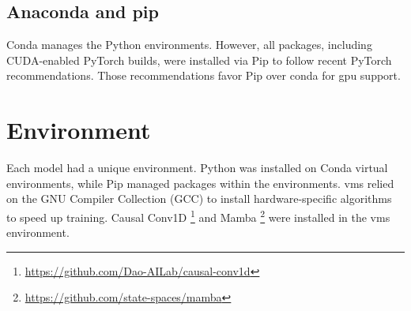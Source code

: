 \subsection{Anaconda and pip}
\label{ssec:conda_pip}
Conda manages the Python environments. However, all packages, including CUDA-enabled PyTorch builds, were installed via Pip to follow recent PyTorch recommendations. Those recommendations favor Pip over conda for \acrshort{gpu} support.

\section{Environment} 

Each model had a unique environment. Python was installed on Conda virtual environments, while Pip managed packages within the environments. \acrshort{vms} relied on the GNU Compiler Collection (GCC) to install hardware-specific algorithms to speed up training. Causal Conv1D \footnote{\url{https://github.com/Dao-AILab/causal-conv1d}} and Mamba \footnote{\url{https://github.com/state-spaces/mamba}}  were installed in the \acrshort{vms} environment.